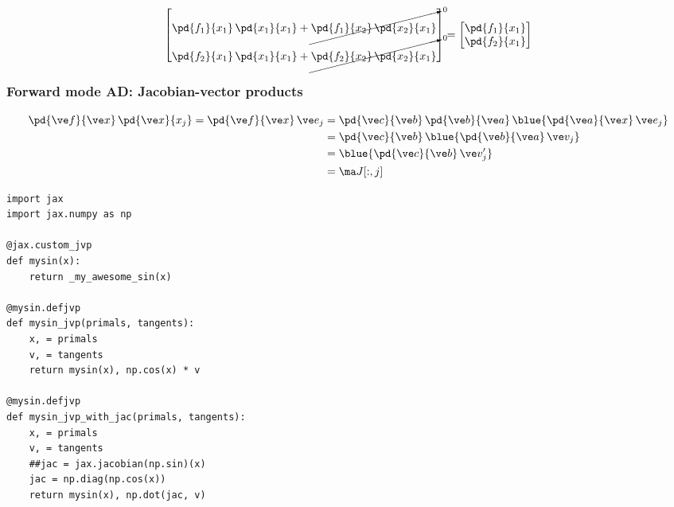\documentclass[fleqn,10pt]{beamer}
\begin{document}
\begin{frame}
{{\begin{equation*}
\begin{bmatrix}
                \pd{f_1}{x_1}\,\pd{x_1}{x_1} + \cancelto{0}{\pd{f_1}{x_2}\,\pd{x_2}{x_1}} \\
                \pd{f_2}{x_1}\,\pd{x_1}{x_1} + \cancelto{0}{\pd{f_2}{x_2}\,\pd{x_2}{x_1}} \\
            \end{bmatrix}
            =
            \begin{bmatrix}
                \pd{f_1}{x_1} \\
                \pd{f_2}{x_1} \\
            \end{bmatrix}
        \end{equation*}
        }
    }
\end{frame}

\begin{frame}
    \frametitle{Forward mode AD: Jacobian-vector products}
    \begin{align*}
        \pd{\ve f}{\ve x}\,\pd{\ve x}{x_j} = \pd{\ve f}{\ve x}\,\ve e_j
            &= \pd{\ve c}{\ve b}\,\pd{\ve b}{\ve a}\,\blue{\pd{\ve a}{\ve x}\,\ve e_j} \\
            &= \pd{\ve c}{\ve b}\,\blue{\pd{\ve b}{\ve a}\,\ve v_j} \\
            &= \blue{\pd{\ve c}{\ve b}\,\ve v_j'} \\
            &= \ma J[:,j]
    \end{align*}
\end{frame}

\begin{frame}[fragile]
    \begin{verbatim}
import jax
import jax.numpy as np

@jax.custom_jvp
def mysin(x):
    return _my_awesome_sin(x)

@mysin.defjvp
def mysin_jvp(primals, tangents):
    x, = primals
    v, = tangents
    return mysin(x), np.cos(x) * v

@mysin.defjvp
def mysin_jvp_with_jac(primals, tangents):
    x, = primals
    v, = tangents
    ##jac = jax.jacobian(np.sin)(x)
    jac = np.diag(np.cos(x))
    return mysin(x), np.dot(jac, v)
    \end{verbatim}
\end{frame}
\end{document}
